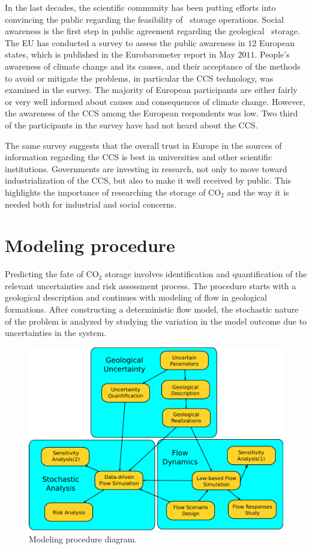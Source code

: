 In the last decades, the scientific community has been putting efforts into
convincing the public regarding the feasibility of \coo\ storage operations. Social awareness is the first step in public agreement regarding the geological \coo\ storage. The EU has conducted a survey to assess the public awareness in $12$ European states, which is published in the Eurobarometer report in May $2011$. People's awareness of climate change and its causes, and their acceptance of the methods to avoid or mitigate the problems, in particular the CCS technology, was examined in the survey. The majority of European participants are either fairly or very well informed about causes and consequences of climate change. However, the awareness of the CCS among the European respondents was low. Two third of the participants in the survey have had not heard about the CCS. 

The same survey suggests that the overall trust in Europe in the sources of
information regarding  the CCS is best in universities and other scientific
institutions. Governments are investing in research, not only to move toward
industrialization of the CCS, but also to make it well received by public. This
highlights the importance of researching the storage of $\mbox{CO}_2$ and the
way it is needed both for industrial and social concerns.

\section{Modeling procedure}
\label{sec:MProcedure}

Predicting the fate of $\mbox{CO}_2$ storage involves identification and
quantification of the  relevant uncertainties and risk assessment process. The
procedure starts with a geological description and continues with modeling of
flow in geological formations. After constructing a deterministic flow model,
the stochastic nature of the problem is analyzed by studying the variation in
the model outcome due to uncertainties in the system. 

\begin{figure}
  \center
  \includegraphics[width=0.95 \linewidth]{./figurer/prc3}
  \caption{Modeling procedure diagram.}
  \label{fig:prc}
%
\end{figure}

